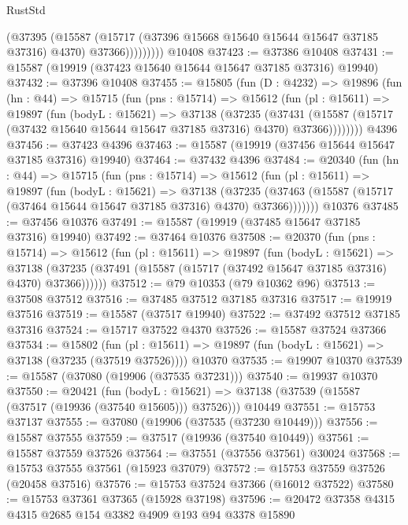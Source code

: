 \begin{lexlean}{RustStd}
\begin{coremodule}
                  (@37395
                    (@15587
                      (@15717 (@37396 @15668 @15640 @15644 @15647 @37185 @37316) @4370)
                      @37366)))))))))
    @10408
@37423 := @37386 @10408
@37431 := @15587 (@19919 (@37423 @15640 @15644 @15647 @37185 @37316) @19940)
@37432 := @37396 @10408
@37455 := @15805
    (fun (D : @4232) =>
    @19896
      (fun (hn : @44) =>
      @15715
        (fun (pns : @15714) =>
        @15612
          (fun (pl : @15611) =>
          @19897
            (fun (bodyL : @15621) =>
            @37138
              (@37235
                (@37431
                  (@15587 (@15717 (@37432 @15640 @15644 @15647 @37185 @37316) @4370) @37366))))))))
    @4396
@37456 := @37423 @4396
@37463 := @15587 (@19919 (@37456 @15644 @15647 @37185 @37316) @19940)
@37464 := @37432 @4396
@37484 := @20340
    (fun (hn : @44) =>
    @15715
      (fun (pns : @15714) =>
      @15612
        (fun (pl : @15611) =>
        @19897
          (fun (bodyL : @15621) =>
          @37138
            (@37235
              (@37463 (@15587 (@15717 (@37464 @15644 @15647 @37185 @37316) @4370) @37366)))))))
    @10376
@37485 := @37456 @10376
@37491 := @15587 (@19919 (@37485 @15647 @37185 @37316) @19940)
@37492 := @37464 @10376
@37508 := @20370
    (fun (pns : @15714) =>
    @15612
      (fun (pl : @15611) =>
      @19897
        (fun (bodyL : @15621) =>
        @37138 (@37235 (@37491 (@15587 (@15717 (@37492 @15647 @37185 @37316) @4370) @37366))))))
@37512 := @79 @10353 (@79 @10362 @96)
@37513 := @37508 @37512
@37516 := @37485 @37512 @37185 @37316
@37517 := @19919 @37516
@37519 := @15587 (@37517 @19940)
@37522 := @37492 @37512 @37185 @37316
@37524 := @15717 @37522 @4370
@37526 := @15587 @37524 @37366
@37534 := @15802
    (fun (pl : @15611) => @19897 (fun (bodyL : @15621) => @37138 (@37235 (@37519 @37526))))
    @10370
@37535 := @19907 @10370
@37539 := @15587 (@37080 (@19906 (@37535 @37231)))
@37540 := @19937 @10370
@37550 := @20421
    (fun (bodyL : @15621) => @37138 (@37539 (@15587 (@37517 (@19936 (@37540 @15605))) @37526)))
    @10449
@37551 := @15753 @37137
@37555 := @37080 (@19906 (@37535 (@37230 @10449)))
@37556 := @15587 @37555
@37559 := @37517 (@19936 (@37540 @10449))
@37561 := @15587 @37559 @37526
@37564 := @37551 (@37556 @37561) @30024
@37568 := @15753 @37555 @37561 (@15923 @37079)
@37572 := @15753 @37559 @37526 (@20458 @37516)
@37576 := @15753 @37524 @37366 (@16012 @37522)
@37580 := @15753 @37361 @37365 (@15928 @37198)
@37596 := @20472
    @37358
    @4315
    @4315
    @2685
    @154
    @3382
    @4909
    @193
    @94
    @3378
    @15890

\end{coremodule}
\end{lexlean}
